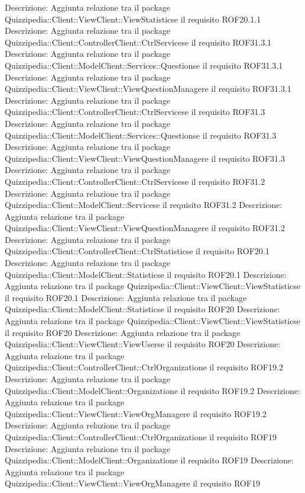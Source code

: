 Descrizione: Aggiunta relazione tra il package Quizzipedia::Client::ViewClient::ViewStatisticse il requisito ROF20.1.1 
Descrizione: Aggiunta relazione tra il package Quizzipedia::Client::ControllerClient::CtrlServicese il requisito ROF31.3.1 
Descrizione: Aggiunta relazione tra il package Quizzipedia::Client::ModelClient::Services::Questionse il requisito ROF31.3.1 
Descrizione: Aggiunta relazione tra il package Quizzipedia::Client::ViewClient::ViewQuestionManagere il requisito ROF31.3.1 
Descrizione: Aggiunta relazione tra il package Quizzipedia::Client::ControllerClient::CtrlServicese il requisito ROF31.3 
Descrizione: Aggiunta relazione tra il package Quizzipedia::Client::ModelClient::Services::Questionse il requisito ROF31.3 
Descrizione: Aggiunta relazione tra il package Quizzipedia::Client::ViewClient::ViewQuestionManagere il requisito ROF31.3 
Descrizione: Aggiunta relazione tra il package Quizzipedia::Client::ControllerClient::CtrlServicese il requisito ROF31.2 
Descrizione: Aggiunta relazione tra il package Quizzipedia::Client::ModelClient::Servicese il requisito ROF31.2 
Descrizione: Aggiunta relazione tra il package Quizzipedia::Client::ViewClient::ViewQuestionManagere il requisito ROF31.2 
Descrizione: Aggiunta relazione tra il package Quizzipedia::Client::ControllerClient::CtrlStatisticse il requisito ROF20.1 
Descrizione: Aggiunta relazione tra il package Quizzipedia::Client::ModelClient::Statisticse il requisito ROF20.1 
Descrizione: Aggiunta relazione tra il package Quizzipedia::Client::ViewClient::ViewStatisticse il requisito ROF20.1 
Descrizione: Aggiunta relazione tra il package Quizzipedia::Client::ModelClient::Statisticse il requisito ROF20 
Descrizione: Aggiunta relazione tra il package Quizzipedia::Client::ViewClient::ViewStatisticse il requisito ROF20 
Descrizione: Aggiunta relazione tra il package Quizzipedia::Client::ViewClient::ViewUserse il requisito ROF20 
Descrizione: Aggiunta relazione tra il package Quizzipedia::Client::ControllerClient::CtrlOrganizatione il requisito ROF19.2 
Descrizione: Aggiunta relazione tra il package Quizzipedia::Client::ModelClient::Organizatione il requisito ROF19.2 
Descrizione: Aggiunta relazione tra il package Quizzipedia::Client::ViewClient::ViewOrgManagere il requisito ROF19.2 
Descrizione: Aggiunta relazione tra il package Quizzipedia::Client::ControllerClient::CtrlOrganizatione il requisito ROF19 
Descrizione: Aggiunta relazione tra il package Quizzipedia::Client::ModelClient::Organizatione il requisito ROF19 
Descrizione: Aggiunta relazione tra il package Quizzipedia::Client::ViewClient::ViewOrgManagere il requisito ROF19 

